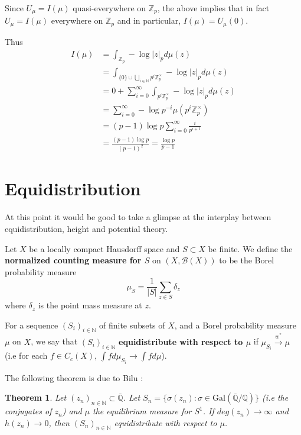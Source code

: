 \documentclass[12pt]{amsart}
\newtheorem{thm}{Theorem}[subsection]
\theoremstyle{definition}
\theoremstyle{remark}
\theoremstyle{definition}
\newcommand{\N}{\mathbb{N}}
\newcommand{\Z}{\mathbb{Z}}
\newcommand{\Q}{\mathbb{Q}}
\newcommand{\MCB}{\mathcal{B}}
\newcommand{\ol}{\overline}
\begin{document}
Since $U_{\mu} = I(\mu)$ quasi-everywhere on $\Z_p$, the above implies that in fact $U_{\mu} = I(\mu)$ everywhere on $\Z_p$ and in particular, $I(\mu) = U_{\mu}(0)$.

Thus 
\begin{align*}
I(\mu) 
&= \int_{\Z_p}-\log|z|_pd\mu(z)\\
&= \int_{\{0\}\cup \bigcup\limits_{i \in \N}p^i\Z_p^{\times}}-\log|z|_pd\mu(z)\\
&= 0+ \sum_{i=0}^{\infty} \int_{p^i\Z_p^{\times}}-\log|z|_p d\mu(z)\\
&= \sum_{i=0}^{\infty}-\log p^{-i} \mu(p^i\Z_p^{\times})\\
&= (p-1)\log p \sum_{i=0}^{\infty}\frac{i}{p^{i+1}}\\
&= \frac{(p-1)  \log p}{(p-1)^2} = \frac{\log p}{p-1} 
\end{align*}  

\section{Equidistribution}

At this point it would be good to take a glimpse at the interplay between equidistribution, height and potential theory. 

Let $X$ be a locally compact Hausdorff space and $S \subset X $ be finite. We define the \textbf{normalized counting measure for $S$} on $(X, \MCB(X))$ to be the Borel probability measure $$\mu_S = \frac{1}{|S|}\sum\limits_{z \in S} \delta_z$$ where $\delta_z$ is the point mass measure at $z$. \

For a sequence $(S_i)_{i \in \N}$ of finite subsets of $X$, and a Borel probability measure $\mu$ on $X$, we say that $(S_i)_{i \in \N}$   \textbf{equidistribute with respect to $\mu$} if $\mu_{S_i} \xrightarrow{w^*} \mu$ (i.e for each $f \in C_c(X)$, $\int f d\mu_{S_i} \rightarrow \int f d\mu$).

The following theorem is due to Bilu \cite{Bilu}:

\begin{thm}

Let $(z_n)_{n \in \N} \subset \overline{\Q}$. Let $S_n = \{\sigma(z_n): \sigma \in \mathrm{Gal}(\ol{ \Q }/ \Q )\}$ (i.e the conjugates of $z_n$) and $\mu$ the equilibrium measure for $S^1$. If $deg(z_n) \rightarrow \infty$ and $h(z_n) \rightarrow 0$, then $(S_n)_{n \in \N}$ equidistribute with respect to $\mu$.  

\end{thm}
 
\end{document}
